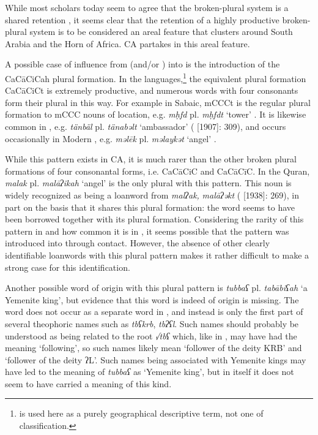 \documentclass[output=paper]{langsci/langscibook}
\begin{document}
While most scholars today seem to agree that the broken-plural system is a shared retention \citep[1116]{Weninger2011GenEth}, it seems clear that the retention of a highly productive broken-plural system is to be considered an areal feature that clusters around South Arabia and the Horn of Africa. CA partakes in this areal feature.

A possible case of influence from  (and/or ) into  is the introduction of the CaCāCiCah plural {formation}. In the  languages,\footnote{ is used here as a purely geographical descriptive term, not one of classification.} the equivalent plural {formation} CaCāCiCt is extremely productive, and numerous words with four consonants form their plural in this way. For example in Sabaic, mCCCt is the regular plural {formation} to mCCC nouns  of location, e.g. \textit{mḥfd} pl. \textit{mḥfdt} ‘tower’ \citep[34]{Beeston1962}. It is likewise common in , e.g. \textit{tänbäl} pl. \textit{tänabəlt} ‘ambassador’ (\citealt{Dillmann2005} [1907]: 309), and occurs occasionally in Modern , e.g.  \textit{məlēk} pl. \textit{məlaykət} ‘angel’ \citep[68]{Rubin2010}.

While this pattern exists in CA, it is much rarer than the other {broken plural} formations of four consonantal forms, i.e. CaCāCiC and CaCāCīC. In the {Quran}, \textit{malak} pl. \textit{malāʔikah} ‘angel’ is the only plural with this pattern. This noun is widely recognized as being a {loanword} from  \textit{malʔak,} \textit{malāʔəkt} (\citealt{Jeffrey2007} [1938]: 269), in part on the basis that it shares this plural {formation}: the word seems to have been borrowed together with its plural {formation}. Considering the rarity of this pattern in  and how common it is in , it seems possible that the pattern was introduced into  through  contact. However, the absence of other clearly identifiable  {loanwords} with this plural pattern makes it rather difficult to make a strong case for this identification.

Another possible word of  origin with this plural pattern is \textit{tubbaʕ} pl. \textit{tabābiʕah} ‘a Yemenite king’, but evidence that this word is indeed of  origin is missing. The word does not occur as a separate word in , and instead is only the first part of several  theophoric names such as \textit{tbʕkrb}, \textit{tbʔʕl}. Such names should probably be understood as being related to the {root} \textit{√tbʕ} which, like in , may have had the meaning ‘following’, so such names likely mean ‘follower of the deity KRB’ and ‘follower of the deity ʔL’. Such names being associated with Yemenite kings may have led to the  meaning of \textit{tubbaʕ} as ‘Yemenite king’, but in  itself it does not seem to have carried a meaning of this kind. 
\end{document}
